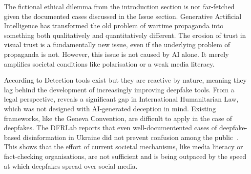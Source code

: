 



The fictional ethical dilemma from the introduction section is not far-fetched given the documented cases discussed in the Issue section. Generative Artificial Intelligence has transformed the old problem of wartime propaganda into something both qualitatively and quantitatively different. The erosion of trust in visual trust is a fundamentally new issue, even if the underlying problem of propaganda is not. However, this issue is not caused by AI alone. It merely amplifies societal conditions like polarisation or a weak media literacy.




According to \citet{muam2026role} Detection tools exist but they are reactive by nature, meaning they lag behind the development of increasingly improving deepfake tools. From a legal perspective, \citet{laws14060083} reveals a significant gap in International Humanitarian Law, which was not designed with AI-generated deception in mind. Existing frameworks, like the Geneva Convention, are difficult to apply in the case of deepfakes. The DFRLab reports that even well-documentented cases of deepfake-based disinformation in Ukraine did not prevent confusion among the public~\citep{osadchuk2024ai}. This shows that the effort of current societal mechanisms, like media literacy or fact-checking organisations, are not sufficient and is being outpaced by the speed at which deepfakes spread over social media.





